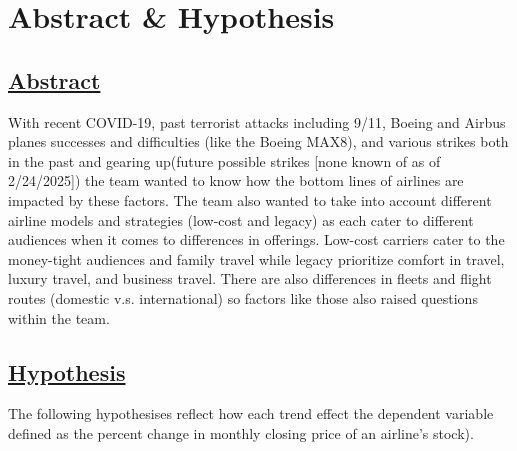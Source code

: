 \documentclass[12pt]{report}
\begin{document}

    \newpage
{}
    \newpage


\newpage
\tableofcontents
\newpage

\chapter*{Abstract \& Hypothesis}
\section*{\underline{Abstract}}
With recent COVID-19, past terrorist attacks including 9/11, Boeing and Airbus planes successes and difficulties (like the Boeing MAX8), and various strikes both in the past and gearing up(future possible strikes [none known of as of 2/24/2025]) the team wanted to know how the bottom lines of airlines are impacted by these factors.
The team also wanted to take into account different airline models and strategies (low-cost and legacy) as each cater to different audiences when it comes to differences in offerings.
Low-cost carriers cater to the money-tight audiences and family travel while legacy prioritize comfort in travel, luxury travel, and business travel.
There are also differences in fleets and flight routes (domestic v.s. international) so factors like those also raised questions within the team.
\newpage
\section*{\underline{Hypothesis}}
The following hypothesises reflect how each trend effect the dependent variable defined as the percent change in monthly closing price of an airline's stock).
\end{document}
